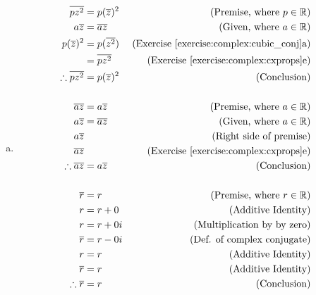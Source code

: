 \begin{enumerate}[(a)]
\item
	\begin{align*}
	\overline{pz^{2}}&= p(\overline{z})^{2}		&\text{(Premise, where}\ p \in {\mathbb{R}})\\
	a\overline{z}&= \overline{az}	&\text{(Given, where}\ a \in {\mathbb{R}})\\
	p(\overline{z})^{2}&= p(\overline{z^{2}}) &\text{(Exercise \ref{exercise:complex:cubic_conj}a)}\\
	&= \overline{pz^{2}} &\text{(Exercise \ref{exercise:complex:cxprops}e)}\\
	\therefore \overline{pz^{2}} &= p(\overline{z})^{2} &\text{(Conclusion)}\\
	\\
	\overline{az}&= a\overline{z}		&\text{(Premise, where}\ a \in {\mathbb{R}})\\
	a\overline{z}&= \overline{az}	&\text{(Given, where}\ a \in {\mathbb{R}})\\
	a\overline{z}& &\text{(Right side of premise)}\\
	\overline{az}& &\text{(Exercise \ref{exercise:complex:cxprops}e)}\\
	\therefore \overline{az} &= a\overline{z} &\text{(Conclusion)}\\
\\
	\overline{r}&= r	&\text{(Premise, where}\ r \in {\mathbb{R}})\\
	r&= r + 0&\text{(Additive Identity)}\\
	r&= r + 0i&\text{(Multiplication by by zero)}\\
	\overline{r}&= r - 0i &\text{(Def. of complex conjugate)}\\
	r&= r &\text{(Additive Identity)}\\
	\overline{r}&= r &\text{(Additive Identity)}\\
	\therefore \overline{r} &= r &\text{(Conclusion)}\\
	\end{align*}
	

\end{enumerate}
